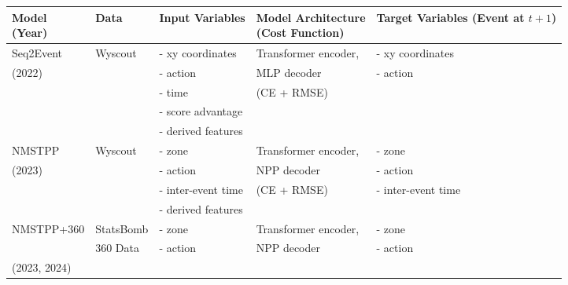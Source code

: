 \begin{table}[h]
\centering
\begin{tabular}{lllll}
\toprule
\parbox{2cm}{ \textbf{Model} \\ \textbf{(Year)}}    & \textbf{Data}       & \textbf{Input Variables}                 & \parbox{3cm}{ \textbf{Model Architecture} \\ \textbf{(Cost Function)}}           & \parbox{3cm}{ \textbf{Target Variables} \\ \textbf{(Event at $t+1$)}}            \\ 
\midrule
Seq2Event \citep{simpson2022seq2event}        & Wyscout \cite{pappalardo2019public}            & - xy coordinates                & Transformer encoder,            & - xy coordinates             \\ 
(2022)                 &                     & - action                        & MLP decoder                     & - action          \\ 
                 &                     & - time                          & (CE + RMSE)                              &                              \\ 
                 &                     & - score advantage               &                                 &                              \\ 
                 &                     & - derived features\footnotemark[2]              &                                 &                              \\ 
\hline
NMSTPP \citep{yeung2023transformer}           & Wyscout \cite{pappalardo2019public}            & - zone                          & Transformer encoder,            & - zone                      \\ 
(2023)                 &                     & - action                        & NPP decoder                     & - action                    \\ 
                 &                     & - inter-event time              & (CE + RMSE)                               & - inter-event time \\ 
                 &                     & - derived features\footnotemark[2]              &                                 &                              \\ 
\hline
NMSTPP+360      & StatsBomb           & - zone                          & Transformer encoder,            & - zone                      \\ 
\citep{yeung2024unveiling,yeung2023events}                  &   360 Data                  & - action                        & NPP decoder                     & - action                    \\ (2023, 2024)

\end{tabular}
\end{table}
